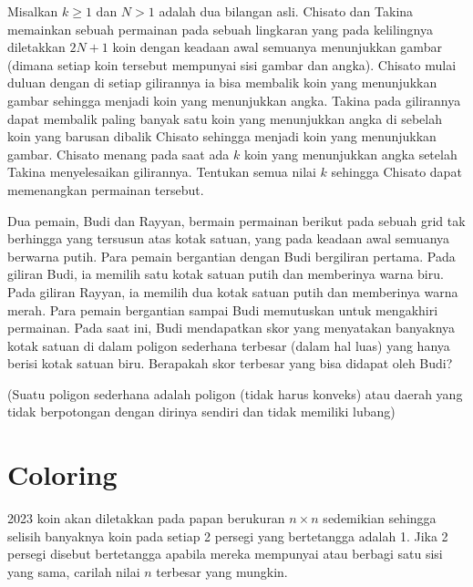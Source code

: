 \documentclass[11pt]{scrartcl}
\begin{document}
\begin{soaljawab}
    Misalkan $k \ge 1$ dan $N > 1$ adalah dua bilangan asli. Chisato dan Takina memainkan sebuah permainan pada sebuah lingkaran yang pada kelilingnya diletakkan $2N+1$ koin dengan keadaan awal semuanya menunjukkan gambar (dimana setiap koin tersebut mempunyai sisi gambar dan angka). Chisato mulai duluan dengan di setiap gilirannya ia bisa membalik koin yang menunjukkan gambar sehingga menjadi koin yang menunjukkan angka. Takina pada gilirannya dapat membalik paling banyak satu koin yang menunjukkan angka di sebelah koin yang barusan dibalik Chisato sehingga menjadi koin yang menunjukkan gambar. Chisato menang pada saat ada $k$ koin yang menunjukkan angka setelah Takina menyelesaikan gilirannya. Tentukan semua nilai $k$ sehingga Chisato dapat memenangkan permainan tersebut.
\end{soaljawab}

\begin{soaljawab}
Dua pemain, Budi dan Rayyan, bermain permainan berikut pada sebuah grid tak berhingga yang tersusun atas kotak satuan, yang pada keadaan awal semuanya berwarna putih. Para pemain bergantian dengan Budi bergiliran pertama. Pada giliran Budi, ia memilih satu kotak satuan putih dan memberinya warna biru. Pada giliran Rayyan, ia memilih dua kotak satuan putih dan memberinya warna merah. Para pemain bergantian sampai Budi memutuskan untuk mengakhiri permainan. Pada saat ini, Budi mendapatkan skor yang menyatakan banyaknya kotak satuan di dalam poligon sederhana terbesar (dalam hal luas) yang hanya berisi kotak satuan biru. Berapakah skor terbesar yang bisa didapat oleh Budi?

(Suatu poligon sederhana adalah poligon (tidak harus konveks) atau daerah yang tidak berpotongan dengan dirinya sendiri dan tidak memiliki lubang)
\end{soaljawab}

\section{Coloring}
\begin{soaljawab}
    2023 koin akan diletakkan pada papan berukuran $n \times n$ sedemikian sehingga selisih banyaknya koin pada setiap 2 persegi yang bertetangga adalah 1. Jika 2 persegi disebut bertetangga apabila mereka mempunyai atau berbagi satu sisi yang sama, carilah nilai $n$ terbesar yang mungkin.
\end{soaljawab}
\end{document}

